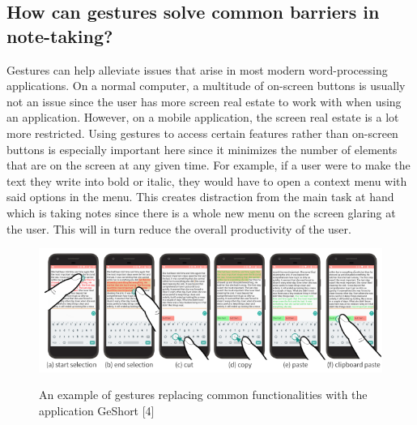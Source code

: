 \documentclass[conference]{IEEEtran}
\begin{document}
\subsection{How can gestures solve common barriers in note-taking?}

Gestures can help alleviate issues that arise in most modern word-processing applications. On a normal computer, a multitude of on-screen buttons is usually not an issue since the user has more screen real estate to work with when using an application. However, on a mobile application, the screen real estate is a lot more restricted. Using gestures to access certain features rather than on-screen buttons is especially important here since it minimizes the number of elements that are on the screen at any given time. For example, if a user were to make the text they write into bold or italic, they would have to open a context menu with said options in the menu. This creates distraction from the main task at hand which is taking notes since there is a whole new menu on the screen glaring at the user. This will in turn reduce the overall productivity of the user.


\begin{figure}[ht]
    \centering
    \includegraphics[scale=0.4]{images/gestures.png}\\
    \caption{An example of gestures replacing common functionalities with the application GeShort [4]}
    \label{fig:enter-label}
\end{figure}
\end{document}
